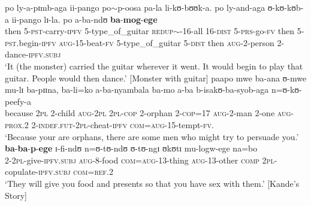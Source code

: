 \begin{exe}
\ex \label{exPSTIPFVSUBJIPFV} \gll po ly-a-pɪmb-aga ii-pango po$\sim$p-oosa pa-la li-kʊ-bʊʊk-a. po ly-and-aga ʊ-kʊ-kʊb-a ii-pango lɪ-la. po a-ba-ndʊ \textbf{ba}-\textbf{mog}-\textbf{ege}\\
then 5-\textsc{pst}-carry-\textsc{ipfv} 5-type\_of\_guitar \textsc{redup}$\sim$-16-all 16-\textsc{dist} 5-\textsc{prs}-go-\textsc{fv} then 5-\textsc{pst}.begin-\textsc{ipfv} \textsc{aug}-15-beat-\textsc{fv} 5-type\_of\_guitar 5-\textsc{dist} then \textsc{aug}-2-person 2-dance-\textsc{ipfv.subj}\\
\glt \lq It (the monster) carried the guitar wherever it went. It would begin to play that guitar. People would then dance.' [Monster with guitar]
\ex \label{exFuturateSUBJIPFV} 
\gll paapo mwe ba-ana ʊ-mwe mu-lɪ ba-pɪɪna, ba-li=ko a-ba-nyambala ba-mo a-ba b-isakʊ-ba-syob-aga n=ʊ-kʊ-peefy-a\\
because \textsc{2pl} 2-child \textsc{aug}-\textsc{2pl} \textsc{2pl}-\textsc{cop} 2-orphan 2-\textsc{cop}=17 \textsc{aug}-2-man 2-one \textsc{aug}-\textsc{prox.2} 2-\textsc{indef.fut}-\textsc{2pl}-cheat-\textsc{ipfv} \textsc{com}=\textsc{aug}-15-tempt-\textsc{fv}.\\
\glt \lq Because your are orphans, there are some men who might try to persuade you.'
\sn \gll \textbf{ba}-\textbf{ba}-\textbf{p}-\textbf{ege} ɪ-fi-ndʊ n=ʊ-tʊ-ndʊ ʊ-tʊ-ngɪ ʊkʊtɪ mu-logw-ege na=bo\\
2-\textsc{2pl}-give-\textsc{ipfv.subj} \textsc{aug}-8-food \textsc{com}=\textsc{aug}-13-thing \textsc{aug}-13-other \textsc{comp} \textsc{2pl}-copulate-\textsc{ipfv.subj} \textsc{com}=\textsc{ref.2}\\
\glt \lq They will give you food and presents so that you have sex with them.' [Kande's Story]\footnotemark
\protect{}
\end{exe}


